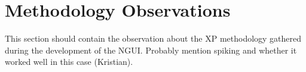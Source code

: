 \section{Methodology Observations}
This section should contain the observation about the XP methodology gathered during the development of the NGUI. Probably mention spiking and whether it worked well in this case (Kristian).